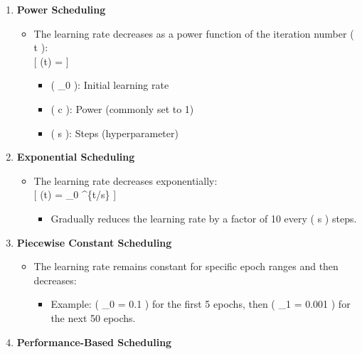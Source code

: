 \documentclass[
  letterpaper,
  DIV=11,
  numbers=noendperiod]{scrreprt}
\providecommand{\tightlist}{%
  \setlength{\itemsep}{0pt}\setlength{\parskip}{0pt}}\usepackage{longtable,booktabs,array}
\begin{document}
\begin{enumerate}
\def\labelenumi{\arabic{enumi}.}
\tightlist
\item
  \textbf{Power Scheduling}

  \begin{itemize}
  \tightlist
  \item
    The learning rate decreases as a power function of the iteration
    number ( t ):\\
    {[} \eta(t) =  {]}

    \begin{itemize}
    \tightlist
    \item
      ( \eta\_0 ): Initial learning rate\\
    \item
      ( c ): Power (commonly set to 1)\\
    \item
      ( s ): Steps (hyperparameter)
    \end{itemize}
  \end{itemize}
\item
  \textbf{Exponential Scheduling}

  \begin{itemize}
  \tightlist
  \item
    The learning rate decreases exponentially:\\
    {[} \eta(t) = \eta\_0 \^{}\{t/s\} {]}

    \begin{itemize}
    \tightlist
    \item
      Gradually reduces the learning rate by a factor of 10 every ( s )
      steps.
    \end{itemize}
  \end{itemize}
\item
  \textbf{Piecewise Constant Scheduling}

  \begin{itemize}
  \tightlist
  \item
    The learning rate remains constant for specific epoch ranges and
    then decreases:

    \begin{itemize}
    \tightlist
    \item
      Example: ( \eta\_0 = 0.1 ) for the first 5 epochs, then ( \eta\_1
      = 0.001 ) for the next 50 epochs.
    \end{itemize}
  \end{itemize}
\item
  \textbf{Performance-Based Scheduling}


\end{enumerate}
\end{document}
